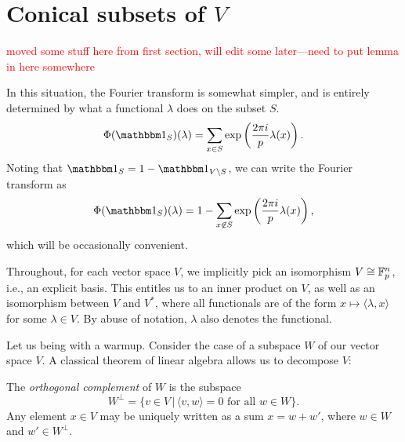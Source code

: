 \section{Conical subsets of $V$}\label{sec:part0}
\textcolor{red}{moved some stuff here from first section, will edit some later---need to put lemma in here somewhere}

In this situation, the Fourier transform is somewhat simpler, and is entirely
determined by what a functional $\lambda$ does on the subset $S$.
\[ \Phi(\IND_S)(\lambda) = \sum_{x\in S} \exp \left(\frac{2\pi i}{p} \lambda(x)\right). \]
Noting that $\IND_S = 1 - \IND_{V\setminus S}$, we can write the Fourier transform as
\[ \Phi(\IND_S)(\lambda) = 1 - \sum_{x\not\in S} \exp \left(\frac{2\pi i}{p} \lambda(x)\right), \]
which will be occasionally convenient. 

\begin{rem}
	Throughout, for each vector space $V$, we implicitly pick an isomorphism 
	$V\cong\mathbb{F}_p^n$, i.e., an explicit basis. This
	entitles us to an inner product on $V$, as well as an isomorphism between $V$ and
	$V^*$, where all functionals are of the form $x \mapsto \langle \lambda, x \rangle$
	for some $\lambda\in V$. By abuse of notation, $\lambda$ also denotes the functional.
\end{rem}

Let us being with a warmup. Consider the case of a subspace $W$ of our vector space $V$.
A classical theorem of linear algebra allows us to decompose $V$:
\begin{prop}
    The \emph{orthogonal complement} of $W$ is the subspace    
    \[ W^\perp = \{ v \in V \,|\, \langle v, w \rangle = 0 \text{ for all } w \in W \}. \]
    Any element $x\in V$ may be uniquely written as a sum $x = w + w'$, where $w\in W$
    and $w'\in W^\perp$.
\end{prop}

